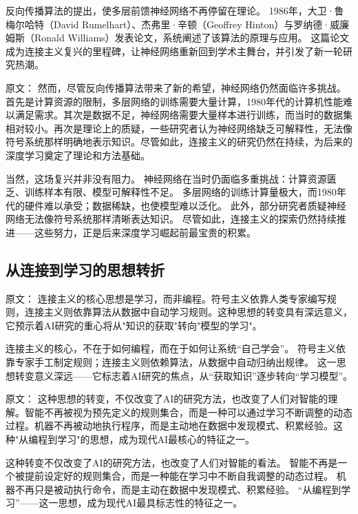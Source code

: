 反向传播算法的提出，使多层前馈神经网络不再停留在理论。  
1986年，大卫·鲁梅尔哈特（David Rumelhart）、杰弗里·辛顿（Geoffrey Hinton）与罗纳德·威廉姆斯（Ronald Williams）发表论文，系统阐述了该算法的原理与应用。  
这篇论文成为连接主义复兴的里程碑，让神经网络重新回到学术主舞台，并引发了新一轮研究热潮。

原文：
然而，尽管反向传播算法带来了新的希望，神经网络仍然面临许多挑战。首先是计算资源的限制，多层网络的训练需要大量计算，1980年代的计算机性能难以满足需求。其次是数据不足，神经网络需要大量样本进行训练，而当时的数据集相对较小。再次是理论上的质疑，一些研究者认为神经网络缺乏可解释性，无法像符号系统那样明确地表示知识。尽管如此，连接主义的研究仍然在持续，为后来的深度学习奠定了理论和方法基础。

当然，这场复兴并非没有阻力。  
神经网络在当时仍面临多重挑战：计算资源匮乏、训练样本有限、模型可解释性不足。  
多层网络的训练计算量极大，而1980年代的硬件难以承受；数据稀缺，也使模型难以泛化。  
此外，部分研究者质疑神经网络无法像符号系统那样清晰表达知识。  
尽管如此，连接主义的探索仍然持续推进——这些努力，正是后来深度学习崛起前最宝贵的积累。

\subsection{从连接到学习的思想转折}

原文：
连接主义的核心思想是学习，而非编程。符号主义依靠人类专家编写规则，连接主义则依靠算法从数据中自动学习规则。这种思想的转变具有深远意义，它预示着AI研究的重心将从"知识的获取"转向"模型的学习"。

连接主义的核心，不在于如何编程，而在于如何让系统“自己学会”。  
符号主义依靠专家手工制定规则；连接主义则依赖算法，从数据中自动归纳出规律。  
这一思想转变意义深远——它标志着AI研究的焦点，从“获取知识”逐步转向“学习模型”。

原文：
这种思想的转变，不仅改变了AI的研究方法，也改变了人们对智能的理解。智能不再被视为预先定义的规则集合，而是一种可以通过学习不断调整的动态过程。机器不再被动地执行程序，而是主动地在数据中发现模式、积累经验。这种"从编程到学习"的思想，成为现代AI最核心的特征之一。

这种转变不仅改变了AI的研究方法，也改变了人们对智能的看法。  
智能不再是一个被提前设定好的规则集合，而是一种能在学习中不断自我调整的动态过程。  
机器不再只是被动执行命令，而是主动在数据中发现模式、积累经验。  
“从编程到学习”——这一思想，成为现代AI最具标志性的特征之一。

